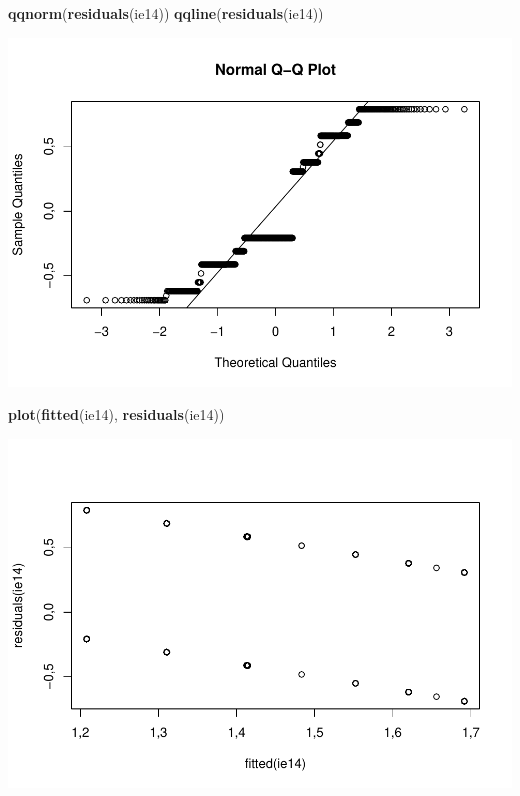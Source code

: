 \documentclass[]{article}
\newenvironment{Shaded}{\begin{snugshade}}{\end{snugshade}}
\newcommand{\KeywordTok}[1]{\textcolor[rgb]{0.13,0.29,0.53}{\textbf{#1}}}
\newcommand{\NormalTok}[1]{#1}
\begin{document}
\begin{Shaded}
\begin{Highlighting}[]
\KeywordTok{qqnorm}\NormalTok{(}\KeywordTok{residuals}\NormalTok{(ie14))}
\KeywordTok{qqline}\NormalTok{(}\KeywordTok{residuals}\NormalTok{(ie14))}
\end{Highlighting}
\end{Shaded}

\includegraphics{titanicDataClean_files/figure-latex/unnamed-chunk-25-13.pdf}

\begin{Shaded}
\begin{Highlighting}[]
\KeywordTok{plot}\NormalTok{(}\KeywordTok{fitted}\NormalTok{(ie14), }\KeywordTok{residuals}\NormalTok{(ie14))}
\end{Highlighting}
\end{Shaded}

\includegraphics{titanicDataClean_files/figure-latex/unnamed-chunk-25-14.pdf}
\end{document}
